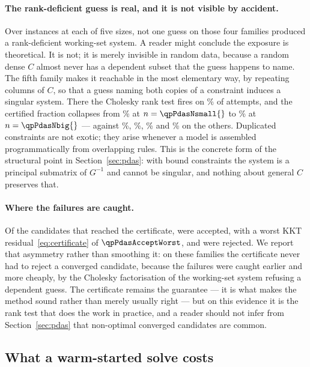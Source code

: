 \paragraph{The rank-deficient guess is real, and it is not visible by accident.}
Over \qpPdasInstances{} instances at each of five sizes, not one guess on those
four families produced a rank-deficient working-set system. A reader might
conclude the exposure is theoretical. It is not; it is merely invisible in random
data, because a random dense $C$ almost never has a dependent subset that the
guess happens to name. The fifth family makes it reachable in the most elementary
way, by repeating columns of $C$, so that a guess naming both copies of a
constraint induces a singular system. There the Cholesky rank test fires on
\qpPdasSingularDup\% of attempts, and the certified fraction collapses from
\qpPdasCertSmall\% at $n = \qpPdasNsmall{}$ to \qpPdasCertBig\% at
$n = \qpPdasNbig{}$ --- against \qpPdasSingularBox\%, \qpPdasSingularBudget\%,
\qpPdasSingularDense\% and \qpPdasSingularEq\% on the others. Duplicated
constraints are not exotic; they arise whenever a model is assembled
programmatically from overlapping rules. This is the concrete form of the
structural point in Section~\ref{sec:pdas}: with bound constraints the system is a
principal submatrix of $G^{-1}$ and cannot be singular, and nothing about general
$C$ preserves that.

\paragraph{Where the failures are caught.} Of the candidates that reached the
certificate, \qpPdasAccepted{} were accepted, with a worst KKT
residual~\eqref{eq:certificate} of $\qpPdasAcceptWorst$, and
\qpPdasRejected{} were rejected. We report that asymmetry rather than smoothing
it: on these families the certificate never had to reject a converged candidate,
because the failures were caught earlier and more cheaply, by the Cholesky
factorisation of the working-set system refusing a dependent guess. The
certificate remains the guarantee --- it is what makes the method sound rather
than merely usually right --- but on this evidence it is the rank test that does
the work in practice, and a reader should not infer from
Section~\ref{sec:pdas} that non-optimal converged candidates are common.

\subsection{What a warm-started solve costs}
\label{ssec:sweepcost}

